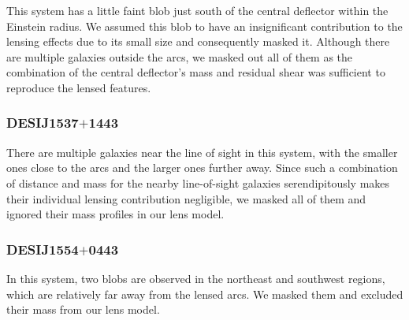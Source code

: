 \documentclass{aa}
\begin{document}
This system has a little faint blob just south of the central deflector within the Einstein radius. We assumed this blob to have an insignificant contribution to the lensing effects due to its small size and consequently masked it. Although there are multiple galaxies outside the arcs, we masked out all of them as the combination of the central deflector's mass and residual shear was sufficient to reproduce the lensed features.

\subsubsection{DESIJ1537$+$1443}

There are multiple galaxies near the line of sight in this system, with the smaller ones close to the arcs and the larger ones further away. Since such a combination of distance and mass for the nearby line-of-sight galaxies serendipitously makes their individual lensing contribution negligible, we masked all of them and ignored their mass profiles in our lens model.

\subsubsection{DESIJ1554$+$0443}


In this system, two blobs are observed in the northeast and southwest regions, which are relatively far away from the lensed arcs. We masked them and excluded their mass from our lens model.
\end{document}
